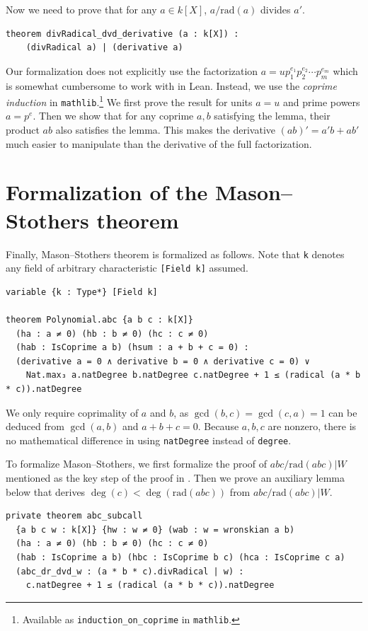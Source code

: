 \documentclass[runningheads]{llncs}
\newcommand{\rad}{\mathrm{rad}}
\begin{document}
Now we need to prove  that for any $a \in k[X]$, $a / \rad(a)$ divides $a'$.
\begin{verbatim}
theorem divRadical_dvd_derivative (a : k[X]) : 
    (divRadical a) | (derivative a)
\end{verbatim}
Our formalization does not explicitly use the factorization $a = u p_1 ^{e_1}  p_2 ^{e_2}  \cdots  p_m ^{e_m}$ which is somewhat cumbersome to work with in Lean.
Instead, we use the \emph{coprime induction} in \texttt{mathlib}.\footnote{Available as \texttt{induction\_on\_coprime} in {\texttt{mathlib}}.}
We first prove the result for units $a = u$ and prime powers $a = p^e$.
Then we show that for any coprime $a, b$ satisfying the lemma, their product $ab$ also satisfies the lemma.
This makes the derivative $(ab)' = a'b + ab'$ much easier to manipulate than the derivative of the full factorization.


\section{Formalization of the Mason--Stothers theorem}
\label{sec:mason-stothers-formal}



Finally, Mason--Stothers theorem is formalized as follows.
Note that \texttt{k} denotes any field of arbitrary characteristic \texttt{[Field k]} assumed.

\begin{verbatim}
variable {k : Type*} [Field k]

theorem Polynomial.abc {a b c : k[X]}
  (ha : a ≠ 0) (hb : b ≠ 0) (hc : c ≠ 0) 
  (hab : IsCoprime a b) (hsum : a + b + c = 0) :
  (derivative a = 0 ∧ derivative b = 0 ∧ derivative c = 0) ∨
    Nat.max₃ a.natDegree b.natDegree c.natDegree + 1 ≤ (radical (a * b * c)).natDegree
\end{verbatim}

We only require coprimality of $a$ and $b$, as $\gcd(b, c) = \gcd(c, a) = 1$ can be deduced from $\gcd(a, b)$ and $a + b + c = 0$.
Because $a, b, c$ are nonzero, there is no mathematical difference in using \texttt{natDegree} instead of \texttt{degree}.
  
To formalize Mason--Stothers, we first formalize the proof of $abc/\rad(abc) | W$ mentioned as the key step of the proof in .
Then we prove an auxiliary lemma below that derives $\deg(c) < \deg(\rad(abc))$ from $abc/\rad(abc) | W$.

\begin{verbatim}
private theorem abc_subcall
  {a b c w : k[X]} {hw : w ≠ 0} (wab : w = wronskian a b)
  (ha : a ≠ 0) (hb : b ≠ 0) (hc : c ≠ 0)
  (hab : IsCoprime a b) (hbc : IsCoprime b c) (hca : IsCoprime c a)
  (abc_dr_dvd_w : (a * b * c).divRadical | w) :
    c.natDegree + 1 ≤ (radical (a * b * c)).natDegree
\end{verbatim}
\end{document}
